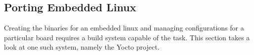 
\subsection{Porting Embedded Linux}

Creating the binaries for an embedded linux and managing configurations for a particular board requires a build system capable of the task. This section takes a look at one such system, namely the Yocto project.

